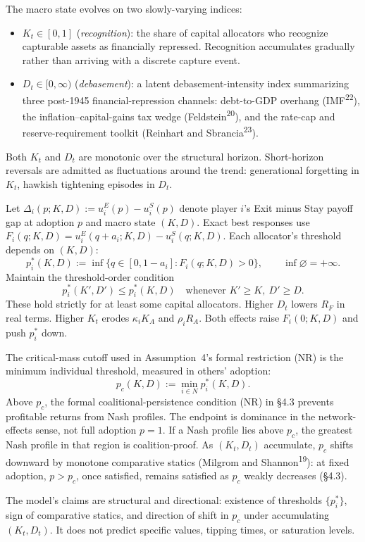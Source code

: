 \documentclass[12pt]{article}
\theoremstyle{definition}
\theoremstyle{remark}
\begin{document}
The macro state evolves on two slowly-varying indices:
\begin{itemize}[nosep,leftmargin=*]
\item $K_t \in [0,1]$ (\emph{recognition}): the share of capital allocators who recognize capturable assets as financially repressed. Recognition accumulates gradually rather than arriving with a discrete capture event.
\item $D_t \in [0, \infty)$ (\emph{debasement}): a latent debasement-intensity index summarizing three post-1945 financial-repression channels: debt-to-GDP overhang (IMF\textsuperscript{22}), the inflation--capital-gains tax wedge (Feldstein\textsuperscript{20}), and the rate-cap and reserve-requirement toolkit (Reinhart and Sbrancia\textsuperscript{23}).
\end{itemize}
Both $K_t$ and $D_t$ are monotonic over the structural horizon. Short-horizon reversals are admitted as fluctuations around the trend: generational forgetting in $K_t$, hawkish tightening episodes in $D_t$.

Let $\Delta_i(p; K, D) := u_i^E(p) - u_i^S(p)$ denote player $i$'s Exit minus Stay payoff gap at adoption $p$ and macro state $(K, D)$. Exact best responses use $F_i(q;K,D)=u_i^E(q+a_i;K,D)-u_i^S(q;K,D)$. Each allocator's threshold depends on $(K,D)$:
\[
p_i^*(K,D):=\inf\{q\in[0,1-a_i]:F_i(q;K,D)>0\},\qquad\inf\varnothing=+\infty.
\]
Maintain the threshold-order condition
\[
p_i^*(K',D')\le p_i^*(K,D)\quad\text{whenever }K'\ge K,\ D'\ge D.
\]
These hold strictly for at least some capital allocators.
Higher $D_t$ lowers $R_F$ in real terms. Higher $K_t$ erodes
$\kappa_i K_A$ and $\rho_i R_A$. Both effects raise
$F_i(0;K,D)$ and push $p_i^*$ down.

The critical-mass cutoff used in Assumption~4's formal restriction (NR) is the minimum individual threshold, measured in others' adoption:
\[
p_c(K,D):=\min_{i\in N}p_i^*(K,D).
\]
Above $p_c$, the formal coalitional-persistence condition (NR) in \S4.3 prevents profitable returns from Nash profiles. The endpoint is dominance in the network-effects sense, not full adoption $p=1$. If a Nash profile lies above $p_c$, the greatest Nash profile in that region is coalition-proof. As $(K_t,D_t)$ accumulate, $p_c$ shifts downward by monotone comparative statics (Milgrom and Shannon\textsuperscript{19}): at fixed adoption, $p>p_c$, once satisfied, remains satisfied as $p_c$ weakly decreases (\S4.3).

The model's claims are structural and directional: existence
of thresholds $\{p_i^*\}$, sign of comparative statics, and
direction of shift in $p_c$ under accumulating $(K_t, D_t)$.
It does not predict specific values, tipping times, or
saturation levels.
\end{document}
